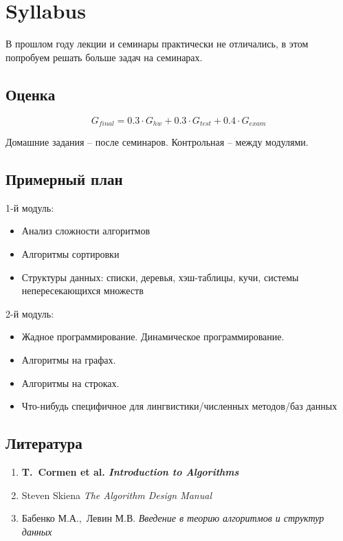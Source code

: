 \chapter{Syllabus}

В прошлом году лекции и семинары практически не отличались, в этом попробуем решать больше задач на семинарах.

\section*{Оценка}

$$
G_{final} = 0.3 \cdot G_{hw} + 0.3 \cdot G_{test} + 0.4 \cdot G_{exam}
$$

Домашние задания -- после семинаров. Контрольная -- между модулями.

\section*{Примерный план}

1-й модуль:

\begin{itemize}
  \item Анализ сложности алгоритмов
  \item Алгоритмы сортировки
  \item Структуры данных: списки, деревья, хэш-таблицы, кучи, системы непересекающихся множеств
\end{itemize}

2-й модуль:

\begin{itemize}
  \item Жадное программирование. Динамическое программирование.
  \item Алгоритмы на графах.
  \item Алгоритмы на строках.
  \item Что-нибудь специфичное для лингвистики/численных методов/баз данных
\end{itemize}

\section*{Литература}

\begin{enumerate}
  \item {\bf T.~Cormen et al. {\em Introduction to Algorithms}}
  \item Steven Skiena {\em The Algorithm Design Manual}
  \item Бабенко М.А.,~Левин М.В. {\em Введение в теорию алгоритмов и структур данных}
\end{enumerate}
